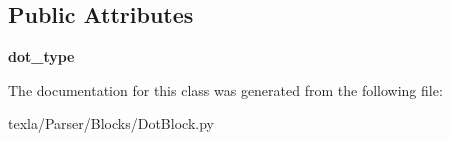 \subsection*{Public Attributes}
\begin{DoxyCompactItemize}
\item 
\hypertarget{classtexla_1_1Parser_1_1Blocks_1_1DotBlock_1_1DotsBlock_a1bc93499359c0302b98393051086f06f}{}\label{classtexla_1_1Parser_1_1Blocks_1_1DotBlock_1_1DotsBlock_a1bc93499359c0302b98393051086f06f} 
{\bfseries dot\+\_\+type}
\end{DoxyCompactItemize}


The documentation for this class was generated from the following file\+:\begin{DoxyCompactItemize}
\item 
texla/\+Parser/\+Blocks/Dot\+Block.\+py\end{DoxyCompactItemize}
